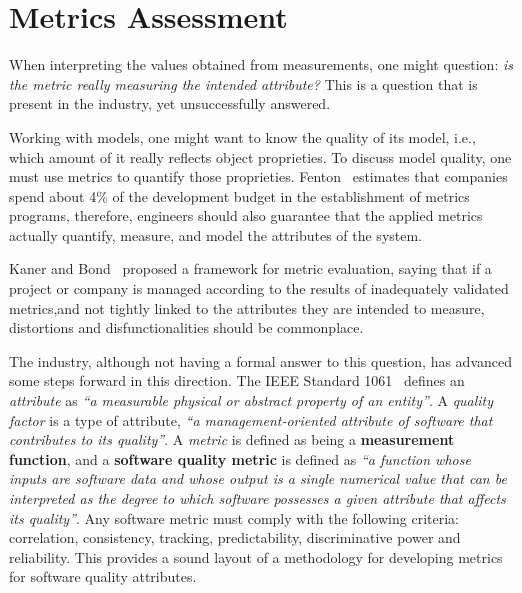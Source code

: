 \section{Metrics Assessment} \label{assess}
\begin{comment}
Effective management of any process requires quantification, measurement, and modeling.
Software metrics provide a quantitative basis for the development and validation of models of the software development process.
Metrics can be used to improve software productivity and quality\cite{g1:Millis:1998}.
\end{comment}



When interpreting the values obtained from measurements, one might question: \emph{is the metric really measuring the intended attribute?} This is a question that is present in the industry, yet unsuccessfully answered. 

Working with models, one might want to know the quality of its model, i.e., which amount of it really reflects object proprieties. To discuss model quality, one must use metrics to quantify those proprieties. Fenton~\cite{g1:Fenton:1999} estimates that companies spend about 4\% of the development budget in the establishment of metrics programs, therefore, engineers should also guarantee that the applied metrics actually quantify, measure, and model the attributes of the system.

Kaner and Bond~\cite{g1:kaner:2004} proposed a framework for metric evaluation, saying that if a project or company is managed according to the results of inadequately validated metrics,and  not tightly linked to the attributes they are intended to measure, distortions and disfunctionalities should be commonplace.

\begin{comment}
	This has a likely consequence: if a project or company is managed according to the results of measurements, and those metrics are inadequately validated, insufficiently understood, and not tightly linked to the attributes they are intended to measure, measurement distortions and dysfunctional should be commonplace\cite{g1:kaner:2004}.
\end{comment}

The industry, although not having a formal answer to this question, has advanced some steps forward in this direction. The IEEE Standard 1061~\cite{g1:Ieee1061:1998} defines an \emph{attribute} as \emph{``a measurable physical or abstract property of an entity''}. A \emph{quality factor} is a type of attribute,
\emph{``a management-oriented attribute of software that contributes to its quality''}. A \emph{metric} is defined as being a {\bf measurement function}, and a {\bf software quality metric} is defined as \emph{``a function whose inputs are software data and whose output is a single numerical value that can be interpreted as the degree to which software possesses a given attribute that affects its quality''}. Any software metric must comply with the following criteria: correlation, consistency, tracking, predictability, discriminative power and reliability.
This provides a sound layout of a methodology for developing metrics for software quality attributes.

